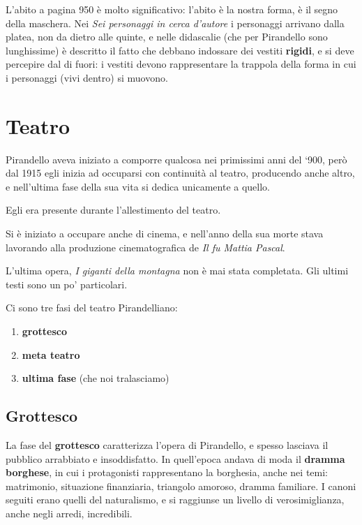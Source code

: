 L’abito a pagina 950 è molto significativo: l’abito è la nostra forma, è il segno della maschera. 
Nei \textit{Sei personaggi in cerca d’autore} i personaggi arrivano dalla platea, non da dietro alle quinte, e nelle didascalie (che per Pirandello sono lunghissime) è descritto il fatto che debbano indossare dei vestiti \textbf{rigidi}, e si deve percepire dal di fuori: i vestiti devono rappresentare la trappola della forma in cui i personaggi (vivi dentro) si muovono.


\chapter{Teatro}

Pirandello aveva iniziato a comporre qualcosa nei primissimi anni del ‘900, però dal 1915 egli inizia ad occuparsi con continuità al teatro, producendo anche altro, e nell’ultima fase della sua vita si dedica unicamente a quello.

Egli era presente durante l’allestimento del teatro.

Si è iniziato a occupare anche di cinema, e nell’anno della sua morte stava lavorando alla produzione cinematografica de \textit{Il fu Mattia Pascal}.

L’ultima opera, \textit{I giganti della montagna} non è mai stata completata.
Gli ultimi testi sono un po’ particolari.

Ci sono tre fasi del teatro Pirandelliano:
\begin{enumerate}
\item \textbf{grottesco}
\item \textbf{meta teatro}
\item \textbf{ultima fase} (che noi tralasciamo)
\end{enumerate}

\section{Grottesco}

La fase del \textbf{grottesco} caratterizza l’opera di Pirandello, e spesso lasciava il pubblico arrabbiato e insoddisfatto. 
In quell’epoca andava di moda il \textbf{dramma borghese}, in cui i protagonisti rappresentano la borghesia, anche nei temi: matrimonio, situazione finanziaria, triangolo amoroso, dramma familiare. I canoni seguiti erano quelli del naturalismo, e si raggiunse un livello di verosimiglianza, anche negli arredi, incredibili.

